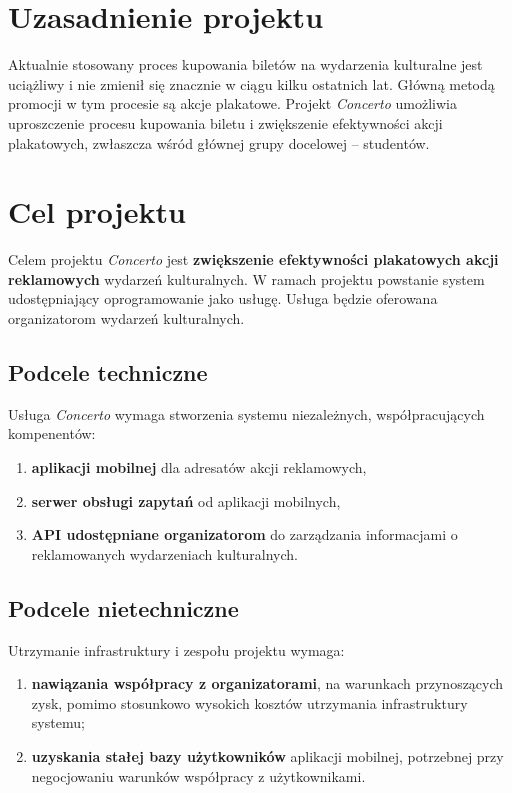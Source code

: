 \documentclass[10pt]{dokument-ppi}
\begin{document}
\MakeDokumentMeta

\section{Uzasadnienie projektu}

Aktualnie stosowany proces kupowania biletów na wydarzenia kulturalne jest
uciążliwy i nie zmienił się znacznie w ciągu kilku ostatnich lat. Główną metodą
promocji w tym procesie są akcje plakatowe. Projekt \emph{Concerto} umożliwia
uproszczenie procesu kupowania biletu i zwiększenie efektywności akcji
plakatowych, zwłaszcza wśród głównej grupy docelowej -- studentów.


\section{Cel projektu}

Celem projektu \emph{Concerto} jest \textbf{zwiększenie efektywności plakatowych
akcji reklamowych} wydarzeń kulturalnych. W ramach projektu powstanie system
udostępniający oprogramowanie jako usługę. Usługa będzie oferowana organizatorom
wydarzeń kulturalnych.

\subsection{Podcele techniczne}

Usługa \emph{Concerto} wymaga stworzenia systemu niezależnych, współpracujących
kompenentów:
\begin{enumerate}
    \item \textbf{aplikacji mobilnej} dla adresatów akcji reklamowych,
    \item \textbf{serwer obsługi zapytań} od aplikacji mobilnych,
    \item \textbf{API udostępniane organizatorom} do zarządzania informacjami o
        reklamowanych wydarzeniach kulturalnych.
\end{enumerate}

\subsection{Podcele nietechniczne}

Utrzymanie infrastruktury i zespołu projektu wymaga:
\begin{enumerate}
    \item \textbf{nawiązania współpracy z organizatorami}, na warunkach
        przynoszących zysk, pomimo stosunkowo wysokich kosztów utrzymania
        infrastruktury systemu;
    \item \textbf{uzyskania stałej bazy użytkowników} aplikacji mobilnej,
        potrzebnej przy negocjowaniu warunków współpracy z użytkownikami.
\end{enumerate}
\end{document}
